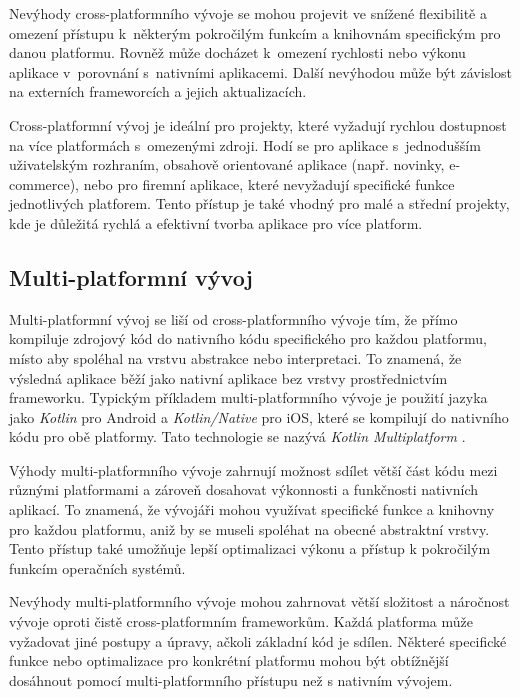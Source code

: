 Nevýhody cross-platformního vývoje se mohou projevit ve snížené flexibilitě a omezení přístupu k~některým pokročilým funkcím a knihovnám specifickým pro danou platformu. Rovněž může docházet k~omezení rychlosti nebo výkonu aplikace v~porovnání s~nativními aplikacemi. Další nevýhodou může být závislost na externích frameworcích a jejich aktualizacích.

Cross-platformní vývoj je ideální pro projekty, které vyžadují rychlou dostupnost na více platformách s~omezenými zdroji. Hodí se pro aplikace s~jednodušším uživatelským rozhraním, obsahově orientované aplikace (např. novinky, e-commerce), nebo pro firemní aplikace, které nevyžadují specifické funkce jednotlivých platforem. Tento přístup je také vhodný pro malé a střední projekty, kde je důležitá rychlá a efektivní tvorba aplikace pro více platform.

\subsection{Multi-platformní vývoj}

Multi-platformní vývoj se liší od cross-platformního vývoje tím, že přímo kompiluje zdrojový kód do nativního kódu specifického pro každou platformu, místo aby spoléhal na vrstvu abstrakce nebo interpretaci. To znamená, že výsledná aplikace běží jako nativní aplikace bez vrstvy prostřednictvím frameworku. Typickým příkladem multi-platformního vývoje je použití jazyka jako \emph{Kotlin} pro Android a \emph{Kotlin/Native} pro iOS, které se kompilují do nativního kódu pro obě platformy. Tato technologie se nazývá \emph{Kotlin Multiplatform} \cite{kotlin-multiplatform}.

Výhody multi-platformního vývoje zahrnují možnost sdílet větší část kódu mezi různými platformami a zároveň dosahovat výkonnosti a funkčnosti nativních aplikací. To znamená, že vývojáři mohou využívat specifické funkce a knihovny pro každou platformu, aniž by se museli spoléhat na obecné abstraktní vrstvy. Tento přístup také umožňuje lepší optimalizaci výkonu a přístup k pokročilým funkcím operačních systémů.

Nevýhody multi-platformního vývoje mohou zahrnovat větší složitost a náročnost vývoje oproti čistě cross-platformním frameworkům. Každá platforma může vyžadovat jiné postupy a úpravy, ačkoli základní kód je sdílen. Některé specifické funkce nebo optimalizace pro konkrétní platformu mohou být obtížnější dosáhnout pomocí multi-platformního přístupu než s nativním vývojem.

